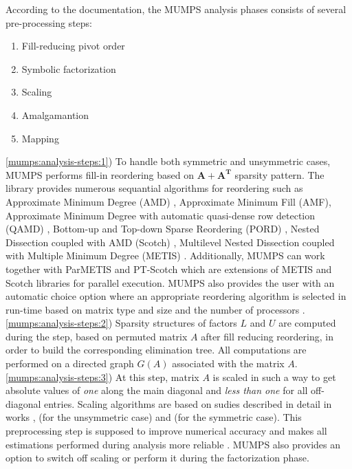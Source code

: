 According to the documentation, the MUMPS analysis phases consists of several pre-processing steps:

\begin{enumerate}
  \item Fill-reducing pivot order \label{mumps:analysis-steps:1}
  \item Symbolic factorization \label{mumps:analysis-steps:2}
  \item Scaling \label{mumps:analysis-steps:3}
  \item Amalgamantion \label{mumps:analysis-steps:4}
  \item Mapping \label{mumps:analysis-steps:5}
\end{enumerate}


\ref{mumps:analysis-steps:1}) To handle both symmetric and unsymmetric cases, MUMPS performs fill-in reordering based on $\boldsymbol{A} + \boldsymbol{A^T}$ sparsity pattern. The library provides numerous sequantial algorithms for reordering such as Approximate Minimum Degree (AMD) \cite{reordering:AMD}, Approximate Minimum Fill (AMF), Approximate Minimum Degree with automatic quasi-dense row detection (QAMD) \cite{reordering:QAMD}, Bottom-up and Top-down Sparse Reordering (PORD) \cite{reordering:PORD}, Nested Dissection coupled with AMD (Scotch) \cite{reordering:SCOTCH}, Multilevel Nested Dissection coupled with Multiple Minimum Degree (METIS) \cite{reordering:METIS}. Additionally, MUMPS can work together with ParMETIS and PT-Scotch which are extensions of METIS and Scotch libraries for parallel execution. MUMPS also provides the user with an automatic choice option where an appropriate reordering algorithm is selected in run-time based on matrix type and size and the number of processors \cite{mumps-manual}.\\


\ref{mumps:analysis-steps:2}) Sparsity structures of factors $L$ and $U$ are computed during the step, based on permuted matrix $A$ after fill reducing reordering, in order to build the corresponding elimination tree. All computations are performed on a directed graph $G(A)$ associated with the matrix $A$.\\


\ref{mumps:analysis-steps:3}) At this step, matrix $A$ is scaled in such a way to get absolute values of \textit{one} along the main diagonal and \textit{less than one} for all off-diagonal entries. Scaling algorithms are based on sudies described in detail in works \cite{mm:scaling:duff1999design}, \cite{mm:scaling:duff2001algorithms} (for the unsymmetric case) and \cite{mm:scaling:duff2005strategies} (for the symmetric case). This preprocessing step is supposed to improve numerical accuracy and makes all estimations performed during analysis more reliable \cite{mumps-manual}. MUMPS also provides an option to switch off scaling or perform it during the factorization phase.\\



